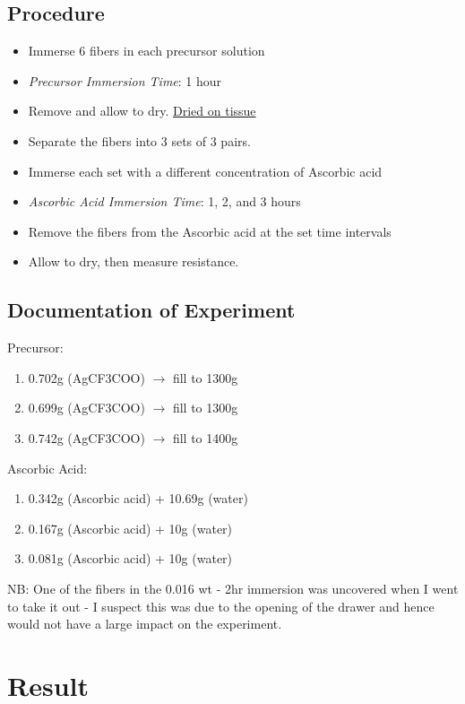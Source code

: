 \documentclass{article}
\begin{document}
\subsection{Procedure}
\begin{itemize}
    \item Immerse 6 fibers in each precursor solution
    \item \textit{Precursor Immersion Time}: 1 hour
    \item Remove and allow to dry. \underline{Dried on tissue}
    \item Separate the fibers into 3 sets of 3 pairs.
    \item Immerse each set with a different concentration of Ascorbic acid
    \item \textit{Ascorbic Acid Immersion Time}: 1, 2, and 3 hours
    \item Remove the fibers from the Ascorbic acid at the set time intervals 
    \item Allow to dry, then measure resistance.
\end{itemize}

\subsection{Documentation of Experiment}
Precursor:
\begin{enumerate}
    \item 0.702g (AgCF3COO) $\rightarrow$ fill to 1300g 
    \item 0.699g (AgCF3COO) $\rightarrow$ fill to 1300g 
    \item 0.742g (AgCF3COO) $\rightarrow$ fill to 1400g 
\end{enumerate}
Ascorbic Acid:
\begin{enumerate}
    \item 0.342g (Ascorbic acid) + 10.69g (water)
    \item 0.167g (Ascorbic acid) + 10g (water)
    \item 0.081g (Ascorbic acid) + 10g (water)
\end{enumerate}


NB: One of the fibers in the 0.016 wt - 2hr immersion was uncovered when I went to take it out - I suspect this was due to the opening of the drawer and hence would not have a large impact on the experiment.


\section{Result}
\end{document}
